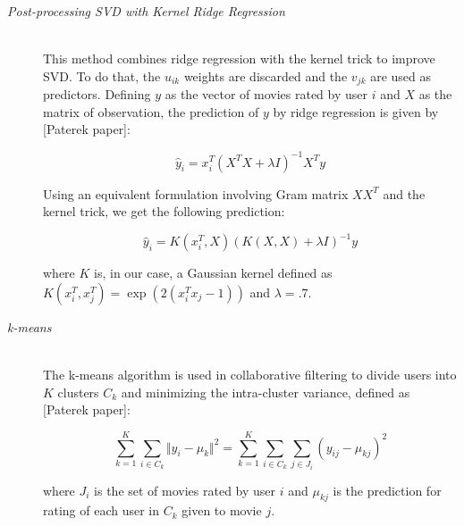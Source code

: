 \documentclass[10pt,conference,compsocconf]{IEEEtran}
\begin{document}
\begin{description}
\item[\emph{Post-processing SVD with Kernel Ridge Regression}] \ \\
This method combines ridge regression with the kernel trick to improve SVD. To do that, the $u_{ik}$ weights are discarded and the $v_{jk}$ are used as predictors. Defining $y$ as the vector of movies rated by user $i$ and $X$ as the matrix of observation, the prediction of $y$ by ridge regression is given by [Paterek paper]:

$$
\hat{y}_i = x_i^T(X^TX + \lambda I)^{-1}X^Ty
$$

\noindent Using an equivalent formulation involving Gram matrix $XX^T$ and the kernel trick, we get the following prediction:

$$
\hat{y}_i = K(x_i^T,X)(K(X,X) + \lambda I)^{-1}y
$$

\noindent where $K$ is, in our case, a Gaussian kernel defined as $K(x_i^T, x_j^T) = \exp(2(x_i^Tx_j-1))$ and $\lambda = .7$.
 
 
\item[\emph{k-means}]\ \\
The k-means algorithm is used in collaborative filtering to divide users into $K$ clusters $C_k$ and minimizing the intra-cluster variance, defined as [Paterek paper]:

$$
\sum_{k=1}^K \sum_{i \in C_k} \Vert y_i - \mu_k \Vert^2 = \sum_{k=1}^K \sum_{i \in C_k} \sum_{j \in J_i} (y_{ij} - \mu_{kj})^2
$$

\noindent where $J_i$ is the set of movies rated by user $i$ and $\mu_{kj}$ is the prediction for rating of each user in $C_k$ given to movie $j$.





\end{description}
\end{document}

